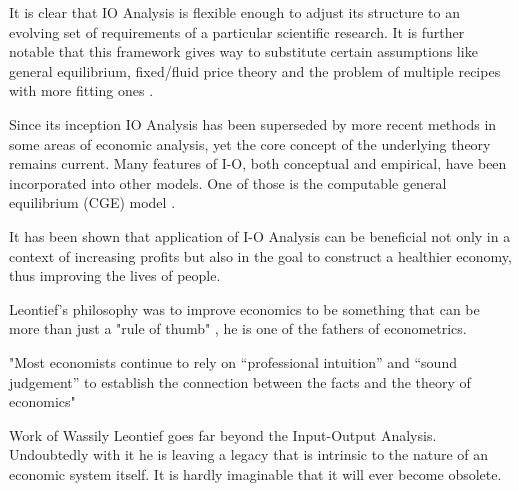 \documentclass[12pt,a4paper]{scrartcl}
\begin{document}
	It is clear that IO Analysis is flexible enough to adjust its structure to an evolving set of requirements of a particular scientific research. It is further notable that this framework gives way to substitute certain assumptions like general equilibrium, fixed/fluid price theory and the problem of multiple recipes with more fitting ones \cite[300]{rose1995}.
	
	Since its inception IO Analysis has been superseded by more recent methods in some areas of economic analysis, yet the core concept of the underlying theory remains current. Many features of I-O, both conceptual and empirical, have been incorporated into other models. One of those is the computable general equilibrium (CGE) model \cite[p.295, p. 297]{rose1995}.
	
	It has been shown that application of I-O Analysis can be beneficial not only in a context of increasing profits but also in the goal to construct a healthier economy, thus improving the lives of people.
	
	Leontief's philosophy was to improve economics to be something that can be more than just a "rule of thumb" \cite[p.~36]{leontief1960niedergang}, he is one of the fathers of econometrics.
	
	"Most economists continue to rely on “professional intuition” and “sound judgement” to establish the connection between the facts and the theory of economics" \cite[p.~13]{leontief1951input}
	
	Work of Wassily Leontief goes far beyond the Input-Output Analysis. Undoubtedly with it he is leaving a legacy that is intrinsic to the nature of an economic system itself. It is hardly imaginable that it will ever become obsolete.
	
	
	
	\clearpage
	
	
		
	\listoftodos

	
	
\end{document}
